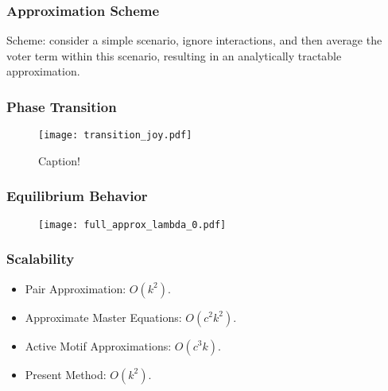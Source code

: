 \documentclass{beamer}
\begin{document}
		
		\begin{frame}\frametitle{Approximation Scheme}
		  	Scheme: consider a simple scenario, ignore interactions, and then average the voter term within this scenario, resulting in an analytically tractable approximation. 
		\end{frame}
	
		
		\begin{frame}\frametitle{Phase Transition}
		  	\begin{figure}
		  		\centering
		  		\texttt{[image: transition\_joy.pdf]}
		  		\caption{Caption!} \label{fig:}
		  	\end{figure}
		\end{frame}
	
		
		\begin{frame}\frametitle{Equilibrium Behavior}
		  	\begin{figure}
		  		\centering
		  		\texttt{[image: full\_approx\_lambda\_0.pdf]}
		  		\caption{} \label{fig:}
		  	\end{figure}
		\end{frame}	
		
		\begin{frame}\frametitle{Scalability}
		  	\begin{itemize}
		  		\item Pair Approximation: $O(k^2)$.
		  		\item Approximate Master Equations: $O(c^2 k^2)$.
		  		\item Active Motif Approximations: $O(c^3 k)$.
		  		\item Present Method: $O(k^2)$. 
		  	\end{itemize}
		\end{frame}
	
\end{document}
